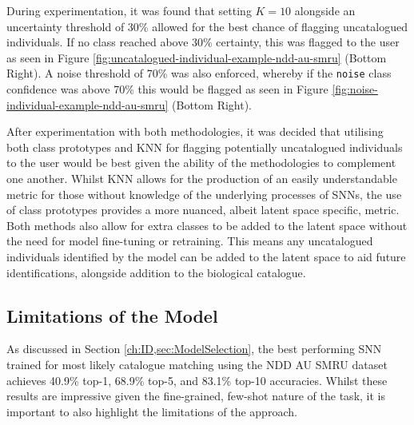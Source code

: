 During experimentation, it was found that setting $K = 10$ alongside an uncertainty threshold of 30\% allowed for the best chance of flagging uncatalogued individuals. If no class reached above 30\% certainty, this was flagged to the user as seen in Figure \ref{fig:uncatalogued-individual-example-ndd-au-smru} (Bottom Right). A noise threshold of 70\% was also enforced, whereby if the \texttt{noise} class confidence was above 70\% this would be flagged as seen in Figure \ref{fig:noise-individual-example-ndd-au-smru} (Bottom Right).

After experimentation with both methodologies, it was decided that utilising both class prototypes and KNN for flagging potentially uncatalogued individuals to the user would be best given the ability of the methodologies to complement one another. Whilst KNN allows for the production of an easily understandable metric for those without knowledge of the underlying processes of SNNs, the use of class prototypes provides a more nuanced, albeit latent space specific, metric. Both methods also allow for extra classes to be added to the latent space without the need for model fine-tuning or retraining. This means any uncatalogued individuals identified by the model can be added to the latent space to aid future identifications, alongside addition to the biological catalogue.

\subsection{Limitations of the Model}\label{ch:ID,sec:ModelSelection,sub:limitations}

As discussed in Section \ref{ch:ID,sec:ModelSelection}, the best performing SNN trained for most likely catalogue matching using the NDD AU SMRU dataset achieves 40.9\% top-1, 68.9\% top-5, and 83.1\% top-10 accuracies. Whilst these results are impressive given the fine-grained, few-shot nature of the task, it is important to also highlight the limitations of the approach. 

